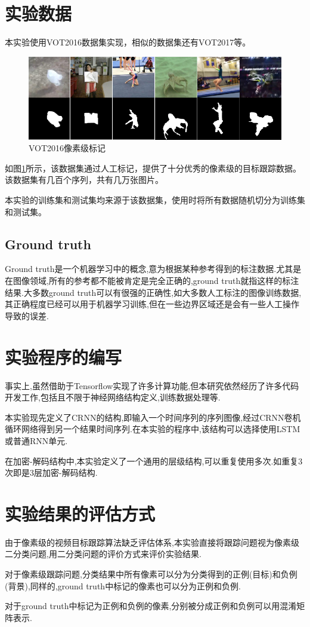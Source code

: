 \section{实验数据}
本实验使用VOT2016数据集\supercite{Vojir-TR-2017-01}实现，相似的数据集还有VOT2017等。
\par
\begin{figure}[htbp!]
    \centering
    \includegraphics[width = 1.\textwidth]{chap/img/vot_2016_pixel.png}
    \caption{VOT2016像素级标记}\label{fig:vot_2016_pixel}
\end{figure}
\par
如图\ref{fig:vot_2016_pixel}所示，该数据集通过人工标记，提供了十分优秀的像素级的目标跟踪数据。该数据集有几百个序列，共有几万张图片。
\par
本实验的训练集和测试集均来源于该数据集，使用时将所有数据随机切分为训练集和测试集。
\subsection{Ground truth}
Ground truth是一个机器学习中的概念,意为根据某种参考得到的标注数据.尤其是在图像领域,所有的参考都不能被肯定是完全正确的,ground truth就指这样的标注结果.大多数ground truth可以有很强的正确性,如大多数人工标注的图像训练数据,其正确程度已经可以用于机器学习训练,但在一些边界区域还是会有一些人工操作导致的误差.

\section{实验程序的编写}
事实上,虽然借助于Tensorflow实现了许多计算功能,但本研究依然经历了许多代码开发工作,包括且不限于神经网络结构定义,训练数据处理等.
\par
本实验现先定义了CRNN的结构,即输入一个时间序列的序列图像,经过CRNN卷机循环网络得到另一个结果时间序列.在本实验的程序中,该结构可以选择使用LSTM或普通RNN单元.
\par
在加密-解码结构中,本实验定义了一个通用的层级结构,可以重复使用多次.如重复3次即是3层加密-解码结构.

\section{实验结果的评估方式}
由于像素级的视频目标跟踪算法缺乏评估体系,本实验直接将跟踪问题视为像素级二分类问题,用二分类问题的评价方式来评价实验结果.
\par
对于像素级跟踪问题,分类结果中所有像素可以分为分类得到的正例(目标)和负例(背景),同样的,ground truth中标记的像素也可以分为正例和负例.
\par
对于ground truth中标记为正例和负例的像素,分别被分成正例和负例可以用混淆矩阵表示.

